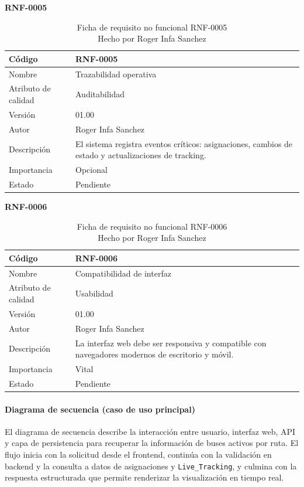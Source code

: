 \textbf{RNF-0005}
\begin{longtable}{|p{}|p{}|}
\caption{Ficha de requisito no funcional RNF-0005\\Hecho por Roger Infa Sanchez} \\
\hline
Código & RNF-0005 \\
\hline
Nombre & Trazabilidad operativa \\
\hline
Atributo de calidad & Auditabilidad \\
\hline
Versión & 01.00 \\
\hline
Autor & Roger Infa Sanchez \\
\hline
Descripción & El sistema registra eventos críticos: asignaciones, cambios de estado y actualizaciones de tracking. \\
\hline
Importancia & Opcional \\
\hline
Estado & Pendiente \\
\hline
\end{longtable}

\textbf{RNF-0006}
\begin{longtable}{|p{}|p{}|}
\caption{Ficha de requisito no funcional RNF-0006\\Hecho por Roger Infa Sanchez} \\
\hline
Código & RNF-0006 \\
\hline
Nombre & Compatibilidad de interfaz \\
\hline
Atributo de calidad & Usabilidad \\
\hline
Versión & 01.00 \\
\hline
Autor & Roger Infa Sanchez \\
\hline
Descripción & La interfaz web debe ser responsiva y compatible con navegadores modernos de escritorio y móvil. \\
\hline
Importancia & Vital \\
\hline
Estado & Pendiente \\
\hline
\end{longtable}

\paragraph{Diagrama de secuencia (caso de uso principal)}

El diagrama de secuencia describe la interacción entre usuario, interfaz web, API y capa de persistencia para recuperar la información de buses activos por ruta. El flujo inicia con la solicitud desde el frontend, continúa con la validación en backend y la consulta a datos de asignaciones y \texttt{Live\_Tracking}, y culmina con la respuesta estructurada que permite renderizar la visualización en tiempo real.

